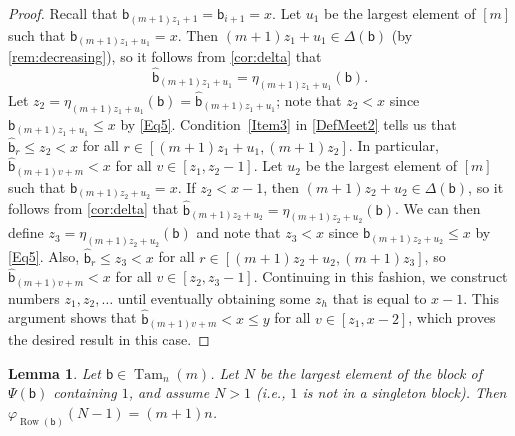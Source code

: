 \documentclass[11pt]{amsart}
\newtheorem{lemma}[theorem]{Lemma}
\theoremstyle{definition}
\DeclareMathOperator{\Tam}{Tam}
\DeclareMathOperator{\row}{Row}
\begin{document}
\begin{proof}
Recall that $\mathsf b_{(m+1)z_1+1}=\mathsf b_{i+1}=x$. Let $u_1$ be the largest element of $[m]$ such that ${\mathsf b_{(m+1)z_1+u_1}=x}$. Then $(m+1)z_1+u_1\in\Delta(\mathsf b)$ (by \cref{rem:decreasing}), so it follows from \cref{cor:delta} that \[\widehat{\mathsf b}_{(m+1)z_1+u_1}=\eta_{(m+1)z_1+u_1}(\mathsf b).\] Let $z_2=\eta_{(m+1)z_1+u_1}(\mathsf b)=\widehat{\mathsf b}_{(m+1)z_1+u_1}$; note that $z_2<x$ since $\mathsf b_{(m+1)z_1+u_1}\leq x$ by \eqref{Eq5}. Condition~\eqref{Item3} in \cref{DefMeet2} tells us that $\widehat{\mathsf b}_r\leq z_2<x$ for all 
$r\in[(m+1)z_1+u_1,(m+1)z_2]$. In particular, $\widehat{\mathsf b}_{(m+1)v+m}<x$ for all $v\in[z_1,z_2-1]$. Let $u_2$ be the largest element of $[m]$ such that $\mathsf b_{(m+1)z_2+u_2}=x$. If $z_2<x-1$, then $(m+1)z_2+u_2\in\Delta(\mathsf b)$, so it follows from \cref{cor:delta} that $\widehat{\mathsf b}_{(m+1)z_2+u_2}=\eta_{(m+1)z_2+u_2}(\mathsf b)$. We can then define $z_3=\eta_{(m+1)z_2+u_2}(\mathsf b)$ and note that $z_3<x$ since $\mathsf b_{(m+1)z_2+u_2}\leq x$ by \eqref{Eq5}. Also, $\widehat{\mathsf b}_r\leq z_3<x$ for all $r\in[(m+1)z_2+u_2,(m+1)z_3]$, so $\widehat{\mathsf b}_{(m+1)v+m}<x$ for all $v\in[z_2,z_3-1]$. Continuing in this fashion, we construct numbers $z_1,z_2,\ldots$ until eventually obtaining some $z_h$ that is equal to $x-1$. This argument shows that $\widehat{\mathsf b}_{(m+1)v+m}<x\leq y$ for all $v\in[z_1,x-2]$, which proves the desired result in this case. 
\end{proof}

\begin{lemma}\label{lem:Claim2}
Let $\mathsf b\in\Tam_n(m)$. Let $N$ be the largest element of the block of $\Psi(\mathsf b)$ containing $1$, and assume $N>1$ (i.e., $1$ is not in a singleton block). Then  $\varphi_{\row(\mathsf b)}(N-1)=(m+1)n$. 
\end{lemma}
\end{document}
